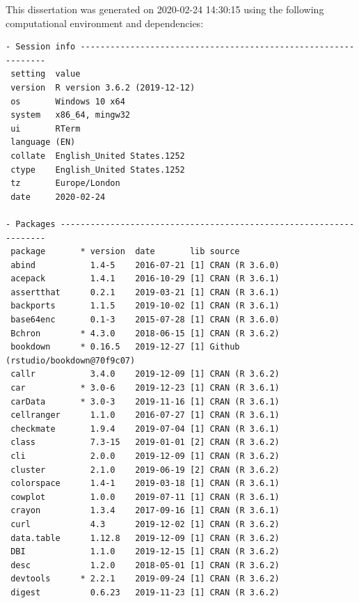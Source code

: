 \documentclass[12pt,twoside]{reedthesis}
\begin{document}
This dissertation was generated on 2020-02-24 14:30:15 using the following computational environment and dependencies:
\begin{verbatim}
- Session info ---------------------------------------------------------------
 setting  value                       
 version  R version 3.6.2 (2019-12-12)
 os       Windows 10 x64              
 system   x86_64, mingw32             
 ui       RTerm                       
 language (EN)                        
 collate  English_United States.1252  
 ctype    English_United States.1252  
 tz       Europe/London               
 date     2020-02-24                  

- Packages -------------------------------------------------------------------
 package       * version  date       lib source                            
 abind           1.4-5    2016-07-21 [1] CRAN (R 3.6.0)                    
 acepack         1.4.1    2016-10-29 [1] CRAN (R 3.6.1)                    
 assertthat      0.2.1    2019-03-21 [1] CRAN (R 3.6.1)                    
 backports       1.1.5    2019-10-02 [1] CRAN (R 3.6.1)                    
 base64enc       0.1-3    2015-07-28 [1] CRAN (R 3.6.0)                    
 Bchron        * 4.3.0    2018-06-15 [1] CRAN (R 3.6.2)                    
 bookdown      * 0.16.5   2019-12-27 [1] Github (rstudio/bookdown@70f9c07) 
 callr           3.4.0    2019-12-09 [1] CRAN (R 3.6.2)                    
 car           * 3.0-6    2019-12-23 [1] CRAN (R 3.6.1)                    
 carData       * 3.0-3    2019-11-16 [1] CRAN (R 3.6.1)                    
 cellranger      1.1.0    2016-07-27 [1] CRAN (R 3.6.1)                    
 checkmate       1.9.4    2019-07-04 [1] CRAN (R 3.6.1)                    
 class           7.3-15   2019-01-01 [2] CRAN (R 3.6.2)                    
 cli             2.0.0    2019-12-09 [1] CRAN (R 3.6.2)                    
 cluster         2.1.0    2019-06-19 [2] CRAN (R 3.6.2)                    
 colorspace      1.4-1    2019-03-18 [1] CRAN (R 3.6.1)                    
 cowplot         1.0.0    2019-07-11 [1] CRAN (R 3.6.1)                    
 crayon          1.3.4    2017-09-16 [1] CRAN (R 3.6.1)                    
 curl            4.3      2019-12-02 [1] CRAN (R 3.6.2)                    
 data.table      1.12.8   2019-12-09 [1] CRAN (R 3.6.2)                    
 DBI             1.1.0    2019-12-15 [1] CRAN (R 3.6.2)                    
 desc            1.2.0    2018-05-01 [1] CRAN (R 3.6.2)                    
 devtools      * 2.2.1    2019-09-24 [1] CRAN (R 3.6.2)                    
 digest          0.6.23   2019-11-23 [1] CRAN (R 3.6.2)                    

\end{verbatim}
\end{document}
